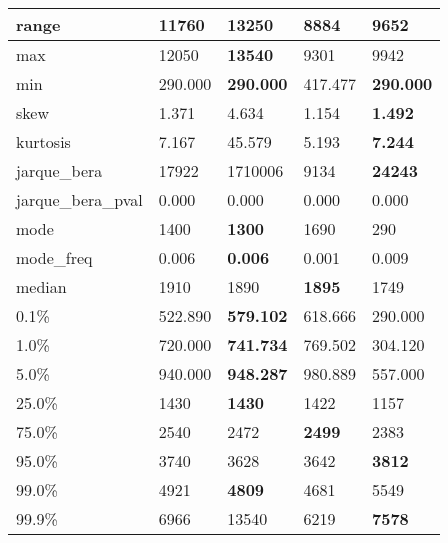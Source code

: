 \begin{table}[H]
\begin{tabular}{|l|m{10em}|m{10em}|m{10em}|m{10em}|}
\hline range & 11760 & \bfseries 13250 & \cellcolor[rgb]{0.9, 0.54, 0.52} 8884 & 9652 \\
\hline max & 12050 & \bfseries 13540 & \cellcolor[rgb]{0.9, 0.54, 0.52} 9301 & 9942 \\
\hline min & 290.000 & \bfseries 290.000 & \cellcolor[rgb]{0.9, 0.54, 0.52} 417.477 & \bfseries 290.000 \\
\hline skew & 1.371 & \cellcolor[rgb]{0.9, 0.54, 0.52} 4.634 & 1.154 & \bfseries 1.492 \\
\hline kurtosis & 7.167 & \cellcolor[rgb]{0.9, 0.54, 0.52} 45.579 & 5.193 & \bfseries 7.244 \\
\hline jarque\_bera & 17922 & \cellcolor[rgb]{0.9, 0.54, 0.52} 1710006 & 9134 & \bfseries 24243 \\
\hline jarque\_bera\_pval & 0.000 & 0.000 & 0.000 & 0.000 \\
\hline mode & 1400 & \bfseries 1300 & 1690 & \cellcolor[rgb]{0.9, 0.54, 0.52} 290 \\
\hline mode\_freq & 0.006 & \bfseries 0.006 & \cellcolor[rgb]{0.9, 0.54, 0.52} 0.001 & 0.009 \\
\hline median & 1910 & 1890 & \bfseries 1895 & \cellcolor[rgb]{0.9, 0.54, 0.52} 1749 \\
\hline 0.1\% & 522.890 & \bfseries 579.102 & 618.666 & \cellcolor[rgb]{0.9, 0.54, 0.52} 290.000 \\
\hline 1.0\% & 720.000 & \bfseries 741.734 & 769.502 & \cellcolor[rgb]{0.9, 0.54, 0.52} 304.120 \\
\hline 5.0\% & 940.000 & \bfseries 948.287 & 980.889 & \cellcolor[rgb]{0.9, 0.54, 0.52} 557.000 \\
\hline 25.0\% & 1430 & \bfseries 1430 & 1422 & \cellcolor[rgb]{0.9, 0.54, 0.52} 1157 \\
\hline 75.0\% & 2540 & 2472 & \bfseries 2499 & \cellcolor[rgb]{0.9, 0.54, 0.52} 2383 \\
\hline 95.0\% & 3740 & \cellcolor[rgb]{0.9, 0.54, 0.52} 3628 & 3642 & \bfseries 3812 \\
\hline 99.0\% & 4921 & \bfseries 4809 & 4681 & \cellcolor[rgb]{0.9, 0.54, 0.52} 5549 \\
\hline 99.9\% & 6966 & \cellcolor[rgb]{0.9, 0.54, 0.52} 13540 & 6219 & \bfseries 7578 \\
\hline
\end{tabular}
\end{table}
